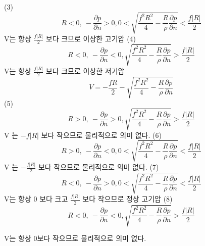 (3)
$${\displaystyle	{
	R<0, ~- \frac{\partial p}{\partial n} > 0 ,  
	0 < \sqrt {\frac{f^{2} R^{2}}{4}-\frac{R}{\rho} \frac{\partial p}{\partial n}} < \frac{f|R|}{2}
}	}$$
V는 항상 ${\frac{f|R|}{2}}$ 보다 크므로 이상한 고기압
(4)
$${\displaystyle	{
		R<0, ~- \frac{\partial p}{\partial n} < 0 ,  
		\sqrt {\frac{f^{2} R^{2}}{4}-\frac{R}{\rho} \frac{\partial p}{\partial n}} > \frac{f|R|}{2}
}}$$
V는 항상 ${\frac{f|R|}{2}}$ 보다 크므로 이상한 저기압
$${\displaystyle	{
	V=-\frac{f R}{2} -\sqrt {\frac{f^{2} R^{2}}{4}-\frac{R}{\rho} \frac{\partial p}{\partial n}}	
}	}$$
(5)
$${\displaystyle	{
	R>0, ~- \frac{\partial p}{\partial n} > 0 ,  
	\sqrt {\frac{f^{2} R^{2}}{4}-\frac{R}{\rho} \frac{\partial p}{\partial n}} > \frac{f|R|}{2}
}}$$
V 는 ${-{f|R|}}$ 보다 작으므로 물리적으로 의미 없다.
(6) 
$${\displaystyle	{
	R>0, ~- \frac{\partial p}{\partial n} < 0 ,  
	0 < \sqrt {\frac{f^{2} R^{2}}{4}-\frac{R}{\rho} \frac{\partial p}{\partial n}} < \frac{f|R|}{2}
}	}$$
V 는  ${-\frac{f|R|}{2}}$  보다 작으므로 물리적으로 의미 없다.
(7)
$${\displaystyle	{
	R<0, ~- \frac{\partial p}{\partial n} > 0 ,  
	0 < \sqrt {\frac{f^{2} R^{2}}{4}-\frac{R}{\rho} \frac{\partial p}{\partial n}} < \frac{f|R|}{2}
}	}$$
V는 항상  0 보다 크고  ${\frac{f|R|}{2}}$ 보다 작으므로 정상 고기압
(8)
$${\displaystyle	{
	R<0, ~- \frac{\partial p}{\partial n} < 0 ,  
	\sqrt {\frac{f^{2} R^{2}}{4}-\frac{R}{\rho} \frac{\partial p}{\partial n}} > \frac{f|R|}{2}
}	}$$

V는 항상  0보다 작으므로 물리적으로 의미 없다.



